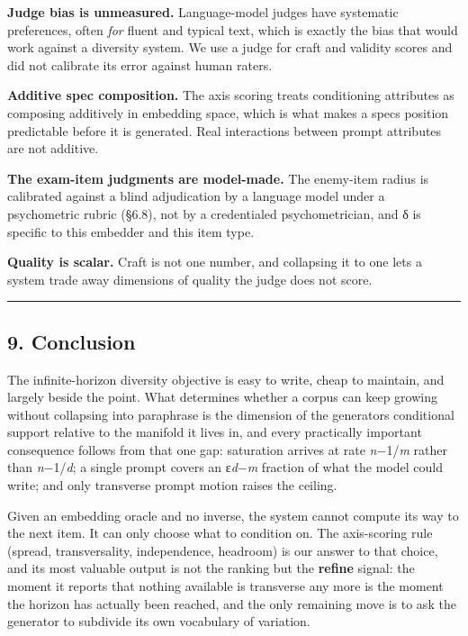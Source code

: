 \documentclass[
  11pt,
]{article}
\theoremstyle{plain}
\theoremstyle{definition}
\begin{document}
\textbf{Judge bias is unmeasured.} Language-model judges have systematic
preferences, often \emph{for} fluent and typical text, which is exactly
the bias that would work against a diversity system. We use a judge for
craft and validity scores and did not calibrate its error against human
raters.

\textbf{Additive spec composition.} The axis scoring treats conditioning
attributes as composing additively in embedding space, which is what
makes a spec\textquotesingle s position predictable before it is
generated. Real interactions between prompt attributes are not additive.

\textbf{The exam-item judgments are model-made.} The enemy-item radius
is calibrated against a blind adjudication by a language model under a
psychometric rubric (§6.8), not by a credentialed psychometrician, and δ
is specific to this embedder and this item type.

\textbf{Quality is scalar.} Craft is not one number, and collapsing it
to one lets a system trade away dimensions of quality the judge does not
score.

\begin{center}\rule{0.5\linewidth}{0.5pt}\end{center}

\subsection{9. Conclusion}\label{9-conclusion}

The infinite-horizon diversity objective is easy to write, cheap to
maintain, and largely beside the point. What determines whether a corpus
can keep growing without collapsing into paraphrase is the dimension of
the generator\textquotesingle s conditional support relative to the
manifold it lives in, and every practically important consequence
follows from that one gap: saturation arrives at rate
\emph{n}−1/\emph{m} rather than \emph{n}−1/\emph{d}; a single prompt
covers an ε\emph{d}−\emph{m} fraction of what the model could write; and
only transverse prompt motion raises the ceiling.

Given an embedding oracle and no inverse, the system cannot compute its
way to the next item. It can only choose what to condition on. The
axis-scoring rule (spread, transversality, independence, headroom) is
our answer to that choice, and its most valuable output is not the
ranking but the \textbf{refine} signal: the moment it reports that
nothing available is transverse any more is the moment the horizon has
actually been reached, and the only remaining move is to ask the
generator to subdivide its own vocabulary of variation.
\end{document}
